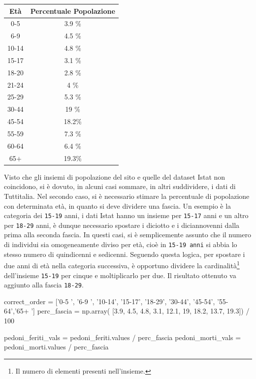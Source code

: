 \documentclass[a4paper,12pt]{report}
\newcommand{\columnstyle}[1]{\texttt{#1}}
\begin{document}
\begin{center}
    \def\arraystretch{1.5}%
    \begin{tabular}{ |c|c| } 
    \hline
    Età & Percentuale Popolazione \\ 
    \hline
    \rowcolor{TableGray}
    0-5     & 3.9 \% \\ 
    6-9     & 4.5 \% \\
    \rowcolor{TableGray}
    10-14   & 4.8 \% \\
    15-17   & 3.1 \% \\
    \rowcolor{TableGray}
    18-20   & 2.8 \% \\ 
    21-24   & 4   \% \\
    \rowcolor{TableGray}
    25-29   & 5.3 \% \\
    30-44   & 19  \% \\
    \rowcolor{TableGray}
    45-54   & 18.2\% \\ 
    55-59   & 7.3 \% \\
    \rowcolor{TableGray}
    60-64   & 6.4 \% \\
    65$+$   & 19.3\% \\
    \hline
    \end{tabular}
\end{center}

Visto che gli insiemi di popolazione del sito e quelle del dataset Istat non coincidono, 
si è dovuto, in alcuni casi sommare, in altri suddividere, i dati di Tuttitalia.
Nel secondo caso, si è necessario stimare la percentuale di popolazione con 
determinata età, in quanto si deve dividere una fascia.
Un esempio è la categoria dei \columnstyle{15-19} anni, 
i dati Istat hanno un insieme per \columnstyle{15-17} anni e un altro per 
\columnstyle{18-29} anni, 
è dunque necessario spostare i diciotto e i diciannovenni dalla prima alla 
seconda fascia. 
In questi casi, si è semplicemente assunto che il numero di individui sia omogeneamente 
diviso per età, cioè in \columnstyle{15-19 anni} si abbia lo stesso numero di 
quindicenni e sedicenni.
Seguendo questa logica, per spostare i due anni di età nella categoria successiva, 
è opportuno dividere la cardinalità\footnote{Il numero di elementi presenti nell'insieme.} 
dell'insieme \columnstyle{15-19} per cinque e moltiplicarlo per due. 
Il risultato ottenuto va aggiunto alla fascia \columnstyle{18-29}.

\begin{code}
correct_order =         ['0-5  ', '6-9  ', '10-14', '15-17', '18-29', '30-44', '45-54', '55-64','65+  ']
perc_fascia = np.array( [3.9, 4.5, 4.8, 3.1, 12.1, 19, 18.2, 13.7, 19.3]) / 100

pedoni_feriti_vals = pedoni_feriti.values / perc_fascia
pedoni_morti_vals = pedoni_morti.values / perc_fascia
\end{code}
\end{document}
